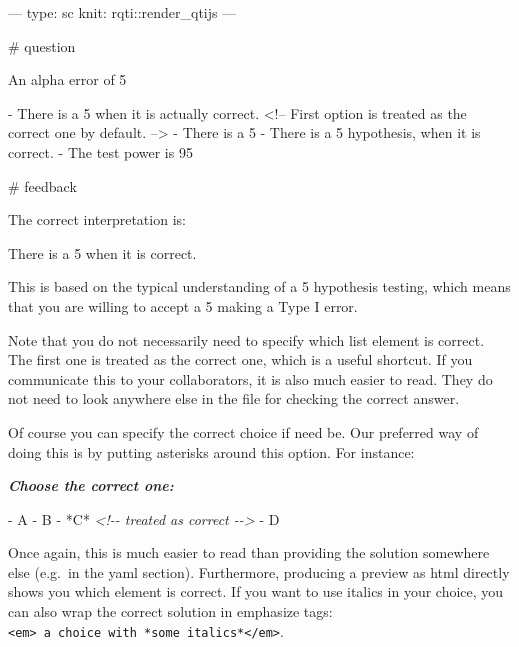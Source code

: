 \documentclass[twoside]{tufte-book}
\newenvironment{Shaded}{}{}
\newcommand{\AnnotationTok}[1]{\textcolor[rgb]{0.38,0.63,0.69}{\textbf{\textit{#1}}}}
\newcommand{\CommentTok}[1]{\textcolor[rgb]{0.38,0.63,0.69}{\textit{#1}}}
\newcommand{\NormalTok}[1]{#1}
\newcommand{\SpecialStringTok}[1]{\textcolor[rgb]{0.73,0.40,0.53}{#1}}
\begin{document}
\begin{Shaded}
\begin{Highlighting}
---
type: sc
knit: rqti::render_qtijs
---

# question

An alpha error of 5% means that:

- There is a 5% probability that you will mistakenly reject the null hypothesis,
when it is actually correct. <!-- First option is treated as the correct one by
default. -->
- There is a 5% probability that the null hypothesis is correct.
- There is a 5% probability that you will mistakenly reject the alternative
hypothesis, when it is correct.
- The test power is 95%.

# feedback

The correct interpretation is:

There is a 5% probability that you will mistakenly reject the null hypothesis,
when it is correct.

This is based on the typical understanding of a 5% significance level in
hypothesis testing, which means that you are willing to accept a 5% chance of
making a Type I error.
\end{Highlighting}
\end{Shaded}

Note that you do not necessarily need to specify which list element is correct. The first one is treated as the correct one, which is a useful shortcut. If you communicate this to your collaborators, it is also much easier to read. They do not need to look anywhere else in the file for checking the correct answer.

Of course you can specify the correct choice if need be. Our preferred way of doing this is by putting asterisks around this option. For instance:

\begin{Shaded}
\begin{Highlighting}[]
\AnnotationTok{Choose the correct one:}

\SpecialStringTok{{-} }\NormalTok{A}
\SpecialStringTok{{-} }\NormalTok{B}
\SpecialStringTok{{-} }\NormalTok{*C* }\CommentTok{\textless{}!{-}{-} treated as correct {-}{-}\textgreater{}}
\SpecialStringTok{{-} }\NormalTok{D}
\end{Highlighting}
\end{Shaded}

Once again, this is much easier to read than providing the solution somewhere else (e.g.~in the yaml section). Furthermore, producing a preview as html directly shows you which element is correct. If you want to use italics in your choice, you can also wrap the correct solution in emphasize tags: \texttt{\textless{}em\textgreater{}\ a\ choice\ with\ *some\ italics*\textless{}/em\textgreater{}}.
\end{document}
